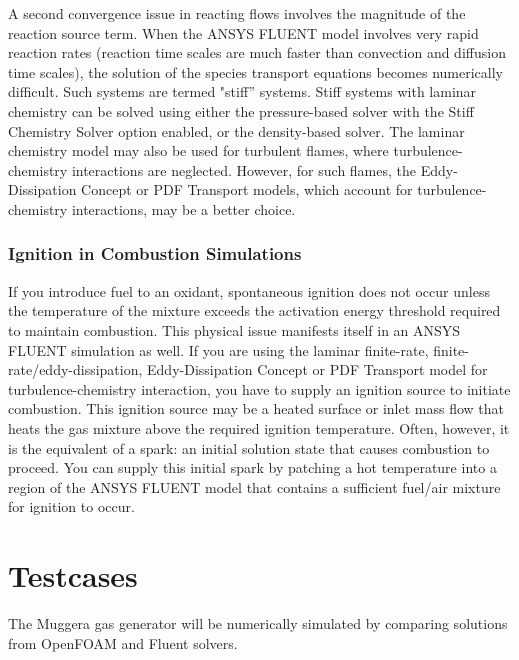 \documentclass[12pt]{article}
\begin{document}
A second convergence issue in reacting flows involves the magnitude of the reaction source term. When the ANSYS FLUENT model involves very rapid reaction rates (reaction time scales are much faster than convection and diffusion time scales), the solution of the species transport equations becomes numerically difficult. Such systems are termed "stiff'' systems. Stiff systems with laminar chemistry can be solved using either the pressure-based solver with the Stiff Chemistry Solver option enabled, or the density-based solver. The laminar chemistry model may also be used for turbulent flames, where turbulence-chemistry interactions are neglected. However, for such flames, the Eddy-Dissipation Concept or PDF Transport models, which account for turbulence-chemistry interactions, may be a better choice. 

\subsubsection{Ignition in Combustion Simulations}
If you introduce fuel to an oxidant, spontaneous ignition does not occur unless the temperature of the mixture exceeds the activation energy threshold required to maintain combustion. This physical issue manifests itself in an ANSYS FLUENT simulation as well. If you are using the laminar finite-rate, finite-rate/eddy-dissipation, Eddy-Dissipation Concept or PDF Transport model for turbulence-chemistry interaction, you have to supply an ignition source to initiate combustion. This ignition source may be a heated surface or inlet mass flow that heats the gas mixture above the required ignition temperature. Often, however, it is the equivalent of a spark: an initial solution state that causes combustion to proceed. You can supply this initial spark by patching a hot temperature into a region of the ANSYS FLUENT model that contains a sufficient fuel/air mixture for ignition to occur. 

\section{Testcases}\label{sec:testcase}
The Muggera gas generator will be numerically simulated by comparing solutions from OpenFOAM and Fluent solvers.


%
%
%
%
%
%
\end{document}

